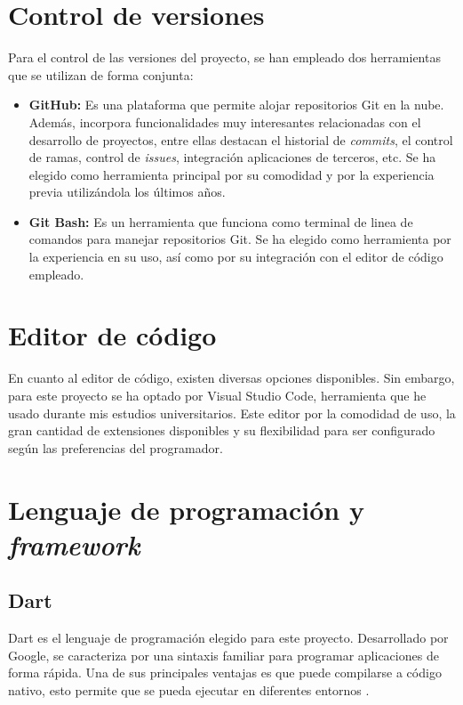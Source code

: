 \section{Control de versiones}

Para el control de las versiones del proyecto, se han empleado dos herramientas que se utilizan de forma conjunta:

\begin{itemize}
    \item \textbf{GitHub:} Es una plataforma que permite alojar repositorios Git en la nube. Además, incorpora funcionalidades muy interesantes relacionadas con el desarrollo de proyectos, entre ellas destacan el historial de \textit{commits}, el control de ramas, control de \textit{issues}, integración aplicaciones de terceros, etc. Se ha elegido como herramienta principal por su comodidad y por la experiencia previa utilizándola los últimos años.
    \item \textbf{Git Bash:} Es un herramienta que funciona como terminal de linea de comandos para manejar repositorios Git. Se ha elegido como herramienta por la experiencia en su uso, así como por su integración con el editor de código empleado.
\end{itemize}

\section{Editor de código}

En cuanto al editor de código, existen diversas opciones disponibles. Sin embargo, para este proyecto se ha optado por Visual Studio Code, herramienta que he usado durante mis estudios universitarios. Este editor por la comodidad de uso, la gran cantidad de extensiones disponibles y su flexibilidad para ser configurado según las preferencias del programador.

\section{Lenguaje de programación y \textit{framework}}

\subsection{Dart}

Dart es el lenguaje de programación elegido para este proyecto. Desarrollado por Google, se caracteriza por una sintaxis familiar para programar aplicaciones de forma rápida. Una de sus principales ventajas es que puede compilarse a código nativo, esto permite que se pueda ejecutar en diferentes entornos \cite{dart}.

